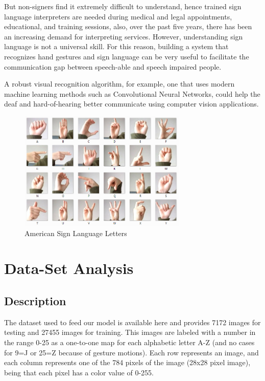 \documentclass[conference]{IEEEtran}
\begin{document}
But non-signers find it extremely difficult to understand, hence trained sign language interpreters are needed during medical and legal appointments, educational, and training sessions, also, over the past five years, there has been an increasing demand for interpreting services. However, understanding sign language is not a universal skill. For this reason, building a system that recognizes hand gestures and sign language can be very useful to facilitate the communication gap between speech-able and speech impaired people.

A robust visual recognition algorithm, for example, one that uses modern machine learning methods such as Convolutional Neural Networks, could help the deaf and hard-of-hearing better communicate using computer vision applications.

\begin{figure}[htbp]
    \centerline{\includegraphics[width=8cm]{img/sign_language_example.png}}
    \caption{American Sign Language Letters}
    \label{fig:hist_train_classes}
\end{figure}


\section{Data-Set Analysis}

\subsection{Description}

The dataset used to feed our model is available here and provides 7172 images for testing and 27455 images for training. This images are labeled with a number in the range 0-25 as a one-to-one map for each alphabetic letter A-Z (and no cases for 9=J or 25=Z because of gesture motions). Each row represents an image, and each column represents one of the 784 pixels of the image (28x28 pixel image), being that each pixel has a color value of 0-255.
\end{document}
